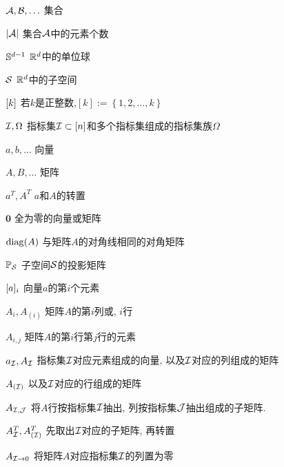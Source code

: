 \begin{denotation}
\item[\(\cA, \cB, \ldots\)] 集合
\item[\(|\cA|\)] 集合\(\cA\)中的元素个数
\item[\(\S^{d-1}\)] \(\R^d\)中的单位球
\item[\(\cS\)] \(\R^d\)中的子空间
\item[\([k\char"005D\)] 若\(k\)是正整数,\([k]:=\left\{ 1, 2, \ldots,k \right\}\)
\item[\(\cI, \Omega\)] 指标集\(\cI\subset [n]\)和多个指标集组成的指标集族\(\Omega\)

\item[\(a, b, \ldots\)] 向量
\item[\(A, B, \ldots\)] 矩阵 
\item[\(a^T, A^T\)] \(a\)和\(A\)的转置 
\item[\(\mathbf{0}\)] 全为零的向量或矩阵 
\item[\(\diag(A)\)] 与矩阵\(A\)的对角线相同的对角矩阵
\item[\(\P_\cS\)] 子空间\(\cS\)的投影矩阵
\item [\([a\char"005D_i \)] 向量\(a\)的第\(i\)个元素
\item[\(A_i, A_{(i)}\) ] 矩阵\(A\)的第\(i\)列或, \(i\)行
\item[\(A_{i, j}\) ] 矩阵\(A\)的第\(i\)行第\(j\)行的元素
\item[\(a_{\cI}, A_{\cI}\)] 指标集\(\cI\)对应元素组成的向量, 以及\(\cI\)对应的列组成的矩阵 
\item[\(A_{(\cI)}\)] 以及\(\cI\)对应的行组成的矩阵 
\item[\(A_{\cI, \cJ}\)] 将\(A\)行按指标集\(\cI\)抽出, 列按指标集\(\cJ\)抽出组成的子矩阵. 
\item[\(A_\cI^T, A_{(\cI)}^T\)] 先取出\(\cI\)对应的子矩阵, 再转置
\item[\(A_{\cI\rightarrow 0}\)] 将矩阵\(A\)对应指标集\(\cI\)的列置为零


\end{denotation}
